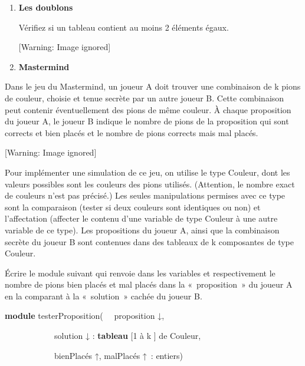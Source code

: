 \bigskip

\liststyleExercice
\setcounter{saveenum}{\value{enumi}}
\begin{enumerate}
\setcounter{enumi}{\value{saveenum}}
\item {\sffamily\bfseries
Les doublons}

{
Vérifiez si un tableau contient au moins 2 éléments égaux.}

\begin{center}
 [Warning: Image ignored] %

\end{center}

\bigskip
\item {\sffamily\bfseries
Mastermind}
\end{enumerate}
{
Dans le jeu du Mastermind, un joueur A doit trouver une combinaison de k
pions de couleur, choisie et tenue secrète par un autre joueur B. Cette
combinaison peut contenir éventuellement des pions de même couleur. À
chaque proposition du joueur A, le joueur B indique le nombre de pions
de la proposition qui sont corrects et bien placés et le nombre de
pions corrects mais mal placés. }

\begin{center}
 [Warning: Image ignored] %

\end{center}
{
Pour implémenter une simulation de ce jeu, on utilise le type Couleur,
dont les valeurs possibles sont les couleurs des pions utilisés.
(Attention, le nombre exact de couleurs n’est pas précisé.) Les seules
manipulations permises avec ce type sont la comparaison (tester si deux
couleurs sont identiques ou non) et l’affectation (affecter le contenu
d’une variable de type Couleur à une autre variable de ce type). Les
propositions du joueur A, ainsi que la combinaison secrète du joueur B
sont contenues dans des tableaux de k composantes de type Couleur.}

{
Écrire le module suivant qui renvoie dans les variables
 et 
respectivement le nombre de pions bien placés et mal placés dans la
«~proposition~» du joueur A en la comparant à la «~solution~» cachée du
joueur B.}

{\sffamily
\textbf{module} testerProposition( \ \ proposition
{↓}, }

{\sffamily
\ \ \ \ \ \ \ \ \ \ \ \ solution {↓} :
\textbf{tableau} [1 à k ] de Couleur, }

{\sffamily
\ \ \ \ \ \ \ \ \ \ \ \ bienPlacés ↑, malPlacés ↑~: entiers)}


\bigskip


\bigskip

